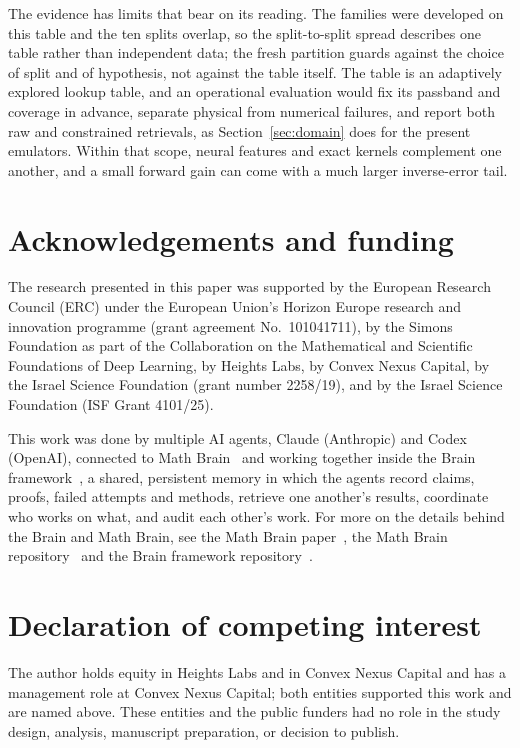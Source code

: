 \documentclass[11pt]{article}
\newcommand{\1}{\mathbf{1}}
\begin{document}
The evidence has limits that bear on its reading. The families were developed on this table and
the ten splits overlap, so the split-to-split spread describes one table rather than independent
data; the fresh partition guards against the choice of split and of hypothesis, not against the
table itself. The table is an adaptively explored lookup table, and an operational evaluation
would fix its passband and coverage in advance, separate physical from numerical failures, and
report both raw and constrained retrievals, as Section~\ref{sec:domain} does for the present
emulators. Within that scope, neural features and exact kernels complement one another, and a
small forward gain can come with a much larger inverse-error tail.

\clearpage
\section*{Acknowledgements and funding}

The research presented in this paper was supported by the European Research Council (ERC) under
the European Union's Horizon Europe research and innovation programme (grant agreement
No.~101041711), by the Simons Foundation as part of the Collaboration on the Mathematical and
Scientific Foundations of Deep Learning, by Heights Labs, by Convex Nexus Capital, by the Israel
Science Foundation (grant number 2258/19), and by the Israel Science Foundation (ISF Grant
4101/25).

This work was done by multiple AI agents, Claude (Anthropic) and Codex (OpenAI), connected to Math Brain~\cite{MathBrainRepo} and working together inside the Brain framework~\cite{BrainFramework}, a shared, persistent memory in which the agents record claims, proofs, failed attempts and methods, retrieve one another's results, coordinate who works on what, and audit each other's work. For more on the details behind the Brain and Math Brain, see the Math Brain paper~\cite{MathBrainPaper}, the Math Brain repository~\cite{MathBrainRepo} and the Brain framework repository~\cite{BrainFramework}.

\section*{Declaration of competing interest}

The author holds equity in Heights Labs and in Convex Nexus Capital and has a management role at
Convex Nexus Capital; both entities supported this work and are named above. These entities and
the public funders had no role in the study design, analysis, manuscript preparation, or
decision to publish.
\end{document}
